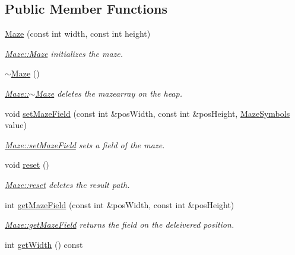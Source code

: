\subsection*{Public Member Functions}
\begin{DoxyCompactItemize}
\item 
\hyperlink{class_maze_a1caad1867d6d3fa28fd3886272b2f618}{Maze} (const int width, const int height)
\begin{DoxyCompactList}\small\item\em \hyperlink{class_maze_a1caad1867d6d3fa28fd3886272b2f618}{Maze\-::\-Maze} initializes the maze. \end{DoxyCompactList}\item 
\hyperlink{class_maze_a4f187353f595193318ac66133a22287e}{$\sim$\-Maze} ()
\begin{DoxyCompactList}\small\item\em \hyperlink{class_maze_a4f187353f595193318ac66133a22287e}{Maze\-::$\sim$\-Maze} deletes the mazearray on the heap. \end{DoxyCompactList}\item 
void \hyperlink{class_maze_a2d05ee06d2d4b6b9abe001e77a256c70}{set\-Maze\-Field} (const int \&pos\-Width, const int \&pos\-Height, \hyperlink{class_maze_a7a19b706242876f2c597033b3374e7fa}{Maze\-Symbols} value)
\begin{DoxyCompactList}\small\item\em \hyperlink{class_maze_a2d05ee06d2d4b6b9abe001e77a256c70}{Maze\-::set\-Maze\-Field} sets a field of the maze. \end{DoxyCompactList}\item 
void \hyperlink{class_maze_aa3f5d822046f02e7a8ddf9dc2fba9a66}{reset} ()
\begin{DoxyCompactList}\small\item\em \hyperlink{class_maze_aa3f5d822046f02e7a8ddf9dc2fba9a66}{Maze\-::reset} deletes the result path. \end{DoxyCompactList}\item 
int \hyperlink{class_maze_ac0fa84d55a0bf27854b1f8a7f0d7cebc}{get\-Maze\-Field} (const int \&pos\-Width, const int \&pos\-Height)
\begin{DoxyCompactList}\small\item\em \hyperlink{class_maze_ac0fa84d55a0bf27854b1f8a7f0d7cebc}{Maze\-::get\-Maze\-Field} returns the field on the deleivered position. \end{DoxyCompactList}\item 
int \hyperlink{class_maze_a55deabec3636694a2658ff902fe83a9b}{get\-Width} () const 

\end{DoxyCompactItemize}
